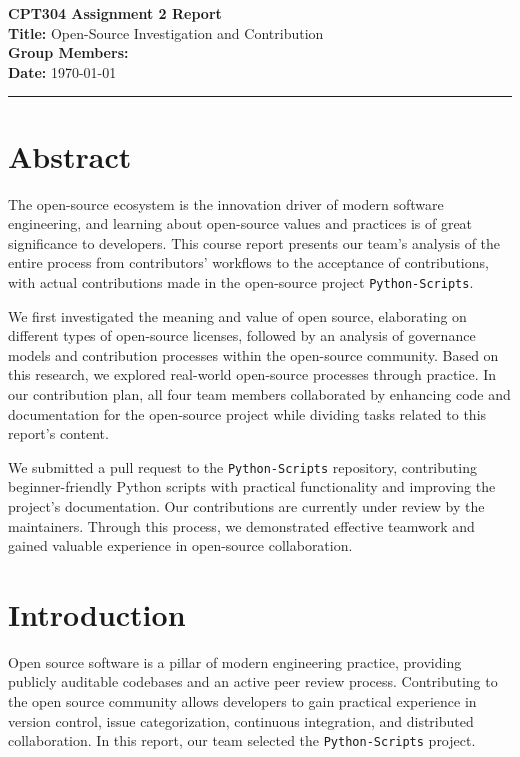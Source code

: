\documentclass[12pt]{article}
\begin{document}
\noindent
\textbf{\Large CPT304 Assignment 2 Report} \\[0.5em]
\textbf{Title:} Open-Source Investigation and Contribution \\[0.5em]
\textbf{Group Members:} 
\\ [0.5em]
\textbf{Date:} \today

\vspace{1em}
\hrule
\vspace{1.5em}

\section*{Abstract}
The open-source ecosystem is the innovation driver of modern software engineering, and learning about open-source values and practices is of great significance to developers. This course report presents our team's analysis of the entire process from contributors' workflows to the acceptance of contributions, with actual contributions made in the open-source project \texttt{Python-Scripts}. 

We first investigated the meaning and value of open source, elaborating on different types of open-source licenses, followed by an analysis of governance models and contribution processes within the open-source community. Based on this research, we explored real-world open-source processes through practice. In our contribution plan, all four team members collaborated by enhancing code and documentation for the open-source project while dividing tasks related to this report's content. 

We submitted a pull request to the \texttt{Python-Scripts} repository, contributing beginner-friendly Python scripts with practical functionality and improving the project’s documentation. Our contributions are currently under review by the maintainers. Through this process, we demonstrated effective teamwork and gained valuable experience in open-source collaboration.

\section{Introduction}
Open source software is a pillar of modern engineering practice, providing publicly auditable codebases and an active peer review process. Contributing to the open source community allows developers to gain practical experience in version control, issue categorization, continuous integration, and distributed collaboration. In this report, our team selected the \texttt{Python-Scripts} project. 
\end{document}
